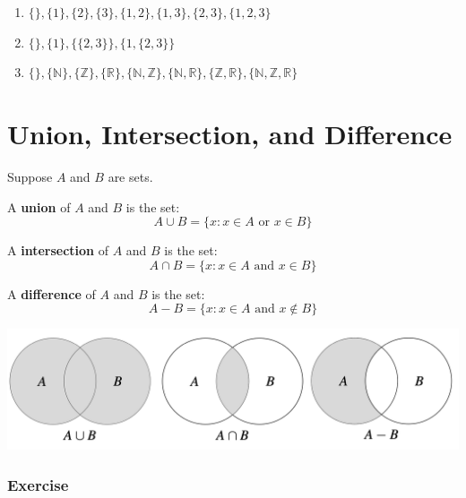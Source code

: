 \documentclass[
  letterpaper,
  DIV=11,
  numbers=noendperiod]{scrreprt}
\providecommand{\tightlist}{%
  \setlength{\itemsep}{0pt}\setlength{\parskip}{0pt}}\usepackage{longtable,booktabs,array}
\begin{document}
\begin{tcolorbox}[enhanced jigsaw, opacityback=0, left=2mm, breakable, bottomtitle=1mm, rightrule=.15mm, colframe=quarto-callout-tip-color-frame, titlerule=0mm, colback=white, opacitybacktitle=0.6, toptitle=1mm, title=\textcolor{quarto-callout-tip-color}{\faLightbulb}\hspace{0.5em}{Solution}, colbacktitle=quarto-callout-tip-color!10!white, bottomrule=.15mm, arc=.35mm, coltitle=black, leftrule=.75mm, toprule=.15mm]

\begin{enumerate}
\def\labelenumi{\arabic{enumi}.}
\tightlist
\item
  \(\{\}, \{1\}, \{2\}, \{3\}, \{1,2\}, \{1,3\}, \{2,3\}, \{1,2,3\}\)
\item
  \(\{\}, \{1\}, \{\{2,3\}\}, \{1,\{2,3\}\}\)
\item
  \(\{\}, \{\mathbb{N}\}, \{\mathbb{Z}\}, \{\mathbb{R}\}, \{\mathbb{N},\mathbb{Z}\}, \{\mathbb{N},\mathbb{R}\}, \{\mathbb{Z},\mathbb{R}\}, \{\mathbb{N},\mathbb{Z},\mathbb{R}\}\)
\end{enumerate}

\end{tcolorbox}

\section{Union, Intersection, and
Difference}\label{union-intersection-and-difference}

Suppose \(A\) and \(B\) are sets.

A \textbf{union} of \(A\) and \(B\) is the set: \[
A \cup B = \{x: x \in A \text{ or } x \in B \}
\]

A \textbf{intersection} of \(A\) and \(B\) is the set: \[
A \cap B = \{x: x \in A \text{ and } x \in B \}
\]

A \textbf{difference} of \(A\) and \(B\) is the set: \[
A - B = \{x: x \in A \text{ and } x \notin B \}
\]

\includegraphics[width=0.75\linewidth,height=\textheight,keepaspectratio]{lecture2/images/union-intersection-complement.png}

\subsubsection{Exercise}\label{exercise-2}
\end{document}
